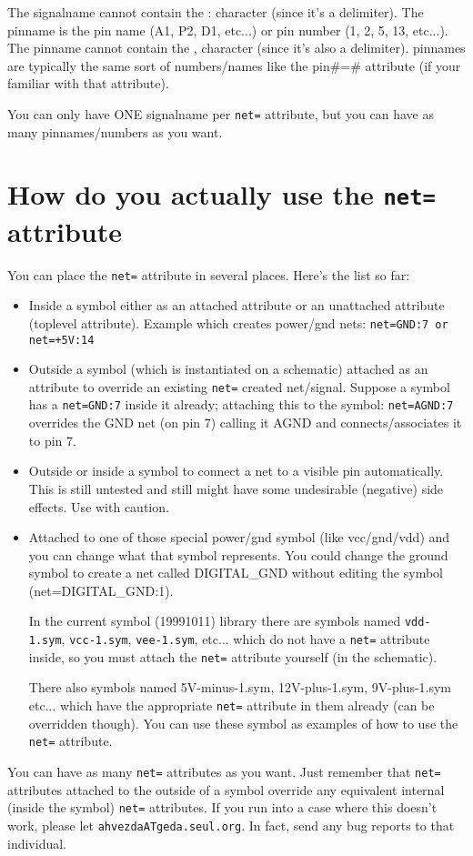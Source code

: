 \documentclass{article}
\begin{document}
The signalname cannot contain the : character (since it's a
delimiter).  The pinname is the pin name (A1, P2, D1, etc...)  or pin
number (1, 2, 5, 13, etc...).  The pinname cannot contain the ,
character (since it's also a delimiter). pinnames are typically the
same sort of numbers/names like the pin\#=\# attribute (if your familiar
with that attribute).

You can only have ONE signalname per {\tt net=} attribute, but you can have
as many pinnames/numbers as you want.



\section{How do you actually use the {\tt net=} attribute}
You can place the {\tt net=} attribute in several places.  
Here's the list so far:
\begin{itemize}
\item Inside a symbol either as an attached attribute or an unattached
attribute (toplevel attribute).  Example which creates power/gnd nets:
{\tt net=GND:7 or net=+5V:14}

\item Outside a symbol (which is instantiated on a schematic) attached
as an attribute to override an existing {\tt net=} created
net/signal. Suppose a symbol has a {\tt net=GND:7} inside it already;
attaching this to the symbol: {\tt net=AGND:7}
overrides the GND net (on pin 7) calling it AGND and
connects/associates it to pin 7.

\item Outside or inside a symbol to connect a net to a visible pin
automatically.  This is still untested and still might have some
undesirable (negative) side effects.  Use with caution.

\item Attached to one of those special power/gnd symbol (like
vcc/gnd/vdd) and you can change what that symbol represents.  You
could change the ground symbol to create a net called DIGITAL\_GND
without editing the symbol (net=DIGITAL\_GND:1).

In the current symbol (19991011) library there are symbols named
{\tt vdd-1.sym}, {\tt vcc-1.sym}, {\tt vee-1.sym}, etc... which do not
have a {\tt net=} attribute inside, so you must attach the {\tt net=}
attribute yourself (in the schematic).

There also symbols named 5V-minus-1.sym, 12V-plus-1.sym, 9V-plus-1.sym
etc... which have the appropriate {\tt net=} attribute in them already
(can be overridden though).  You can use these symbol as examples of
how to use the {\tt net=} attribute.

\end{itemize}
You can have as many {\tt net=} attributes as you want.  Just remember that
{\tt net=} attributes attached to the outside of a symbol override any
equivalent internal (inside the symbol) {\tt net=} attributes.  If you run
into a case where this doesn't work, please let {\tt ahvezdaATgeda.seul.org}.
In fact, send any bug reports to that individual.
\end{document}
